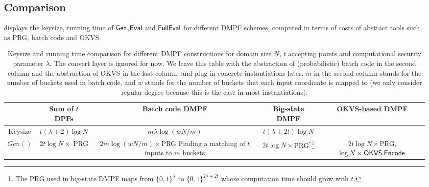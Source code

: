 \subsection{Comparison}
 displays the keysize, running time of ${\sf Gen}$,${\sf Eval}$ and ${\sf FullEval}$ for different DMPF schemes, computed in terms of costs of abstract tools such as PRG, batch code and OKVS. 
	\begin{table*}
    \renewcommand\arraystretch{1.5}
    \caption{Keysize and running time comparison for different DMPF constructions for domain size $N$, $t$ accepting points and computational security parameter $\lambda$. The convert layer is ignored for now. We leave this table with the abstraction of (probabilistic) batch code in the second column and the abstraction of OKVS in the last column, and plug in concrete instantiations later. $m$ in the second column stands for the number of buckets used in batch code, and $w$ stands for the number of buckets that each input coordinate is mapped to (we only consider regular degree because this is the case in most instantiations). }
    \label{tab:formulas_DMPF_comparison}
			\begin{tabular}{ccccc}
				\toprule 
				 &Sum of $t$ DPFs & Batch code DMPF\cite{cryptoeprint:2019/273,cryptoeprint:2019/1084,cryptoeprint:2021/580,cryptoeprint:2017/1142} & Big-state DMPF & OKVS-based DMPF\\

        \midrule

				Keysize & $t(\lambda+2)\log N$ & $m\lambda\log(wN/m)$ & $t(\lambda+2t)\log N$ &\makecell{ $\log N\times\OKVS$ code size}\\

                \cline{1-5}
				
				$Gen()$ & $2t\log N\times $ PRG &\makecell{$2m\log(wN/m)\times $PRG\\Finding a matching of $t$ inputs to $m$ buckets} &$2t\log N\times$PRG$^*$\footnote{The PRG used in big-state DMPF maps from $\{0,1\}^\lambda$ to $\{0,1\}^{2\lambda+2t}$ whose computation time should grow with $t$. } & \makecell{$2t\log N\times$PRG, \\$\log N\times {\sf OKVS}.{\sf Encode}$} \\


\end{tabular}
\end{table*}
